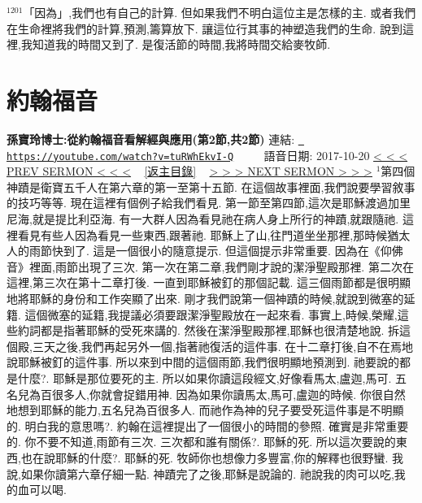 \documentclass{book}
\begin{document}
$^{1201}$「因為」,我們也有自己的計算.
但如果我們不明白這位主是怎樣的主.
或者我們在生命裡將我們的計算,預測,籌算放下.
讓這位行其事的神塑造我們的生命.
說到這裡,我知道我的時間又到了.
是復活節的時間,我將時間交給麥牧師.
\newpage



\section{約翰福音}
\label{sec:tuRWhEkvI_Q}
\textbf{孫寶玲博士:從約翰福音看解經與應用(第2節,共2節)}
\newline
\newline
連結: \href{https://youtube.com/watch?v=tuRWhEkvI-Q}{\texttt{ https://youtube.com/watch?v=tuRWhEkvI-Q}} ~~~~ 語音日期: 2017-10-20 
\newline
\newline
\hyperref[sec:7wbezlnJO0Q]{\small{< < < PREV SERMON < < <}}
~
\hyperref[sec:index]{\small{[返主目錄]}}
~
\hyperref[sec:VHMEb5E_3Qc]{\small{> > > NEXT SERMON > > >}}
\newline
\newline
$^{1}$第四個神蹟是衛寶五千人在第六章的第一至第十五節.
在這個故事裡面,我們說要學習敘事的技巧等等.
現在這裡有個例子給我們看見.
第一節至第四節,這次是耶穌渡過加里尼海,就是提比利亞海.
有一大群人因為看見祂在病人身上所行的神蹟,就跟隨祂.
這裡看見有些人因為看見一些東西,跟著祂.
耶穌上了山,往門道坐坐那裡,那時候猶太人的雨節快到了.
這是一個很小的隨意提示.
但這個提示非常重要.
因為在《仰佛音》裡面,雨節出現了三次.
第一次在第二章,我們剛才說的潔淨聖殿那裡.
第二次在這裡,第三次在第十二章打後.
一直到耶穌被釘的那個記載.
這三個雨節都是很明顯地將耶穌的身份和工作突顯了出來.
剛才我們說第一個神蹟的時候,就說到微塞的延籍.
這個微塞的延籍,我提議必須要跟潔淨聖殿放在一起來看.
事實上,時候,榮耀,這些約詞都是指著耶穌的受死來講的.
然後在潔淨聖殿那裡,耶穌也很清楚地說.
拆這個殿,三天之後,我們再起另外一個,指著祂復活的這件事.
在十二章打後,自不在焉地說耶穌被釘的這件事.
所以來到中間的這個雨節,我們很明顯地預測到.
祂要說的都是什麼?.
耶穌是那位要死的主.
所以如果你讀這段經文,好像看馬太,盧迦,馬可.
五名兒為百很多人,你就會捉錯用神.
因為如果你讀馬太,馬可,盧迦的時候.
你很自然地想到耶穌的能力,五名兒為百很多人.
而祂作為神的兒子要受死這件事是不明顯的.
明白我的意思嗎?.
約翰在這裡提出了一個很小的時間的參照.
確實是非常重要的.
你不要不知道,雨節有三次.
三次都和誰有關係?.
耶穌的死.
所以這次要說的東西,也在說耶穌的什麼?.
耶穌的死.
牧師你也想像力多豐富,你的解釋也很野蠻.
我說,如果你讀第六章仔細一點.
神蹟完了之後,耶穌是說論的.
祂說我的肉可以吃,我的血可以喝.
\end{document}
